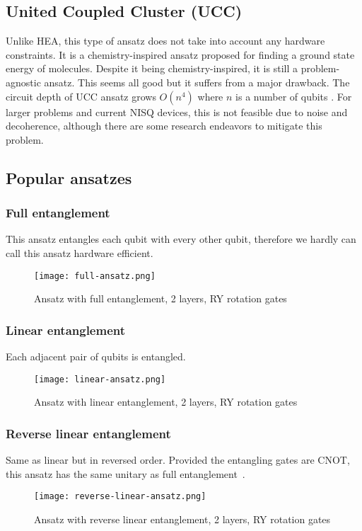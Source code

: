 

\subsection{United Coupled Cluster (UCC)}
Unlike HEA, this type of ansatz does not take into account any hardware constraints. It is a chemistry-inspired ansatz proposed for finding a ground state energy of molecules. Despite it being chemistry-inspired, it is still a problem-agnostic ansatz. This seems all good but it suffers from a major drawback. The circuit depth of UCC ansatz grows $O(n^4)$ where $n$ is a number of qubits \cite{ucc_ansatz}. For larger problems and current NISQ devices, this is not feasible due to noise and decoherence, although there are some research endeavors to mitigate this problem.
  
\subsection{Popular ansatzes}

\subsubsection{Full entanglement}
This ansatz entangles each qubit with every other qubit, therefore we hardly can call this ansatz hardware efficient.
\begin{figure}[H]
    \texttt{[image: full-ansatz.png]}
    \caption{Ansatz with full entanglement, 2 layers, RY rotation gates}
\end{figure}

\subsubsection{Linear entanglement}
Each adjacent pair of qubits is entangled. 
\begin{figure}[H]
    \texttt{[image: linear-ansatz.png]}
    \caption{Ansatz with linear entanglement, 2 layers, RY rotation gates}
\end{figure}

\subsubsection{Reverse linear entanglement}
Same as linear but in reversed order. Provided the entangling gates are CNOT, this ansatz has the same unitary as full entanglement~\cite{twolocal}. 
\begin{figure}[H]
    \texttt{[image: reverse-linear-ansatz.png]}
    \caption{Ansatz with reverse linear entanglement, 2 layers, RY rotation gates}
\end{figure}

